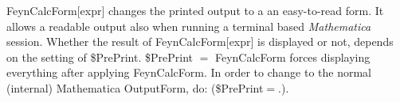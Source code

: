 













FeynCalcForm[expr] changes the printed output to a an easy-to-read form. It allows a readable output also when running a terminal based {\itshape
Mathematica} session. Whether the result of FeynCalcForm[expr] is displayed or not, depends on the setting of \${}PrePrint. \${}PrePrint \(=\)
  FeynCalcForm forces displaying everything after applying FeynCalcForm. In order to change to the normal (internal) Mathematica
  OutputForm, do: (\${}PrePrint\(=\).).

